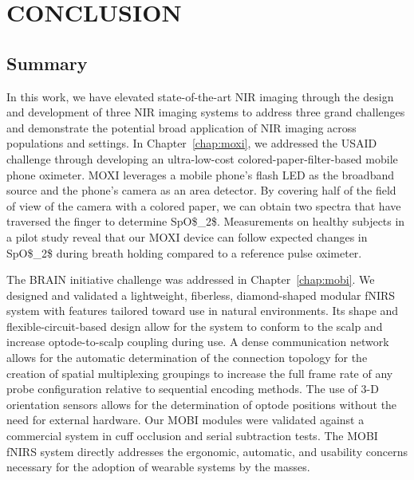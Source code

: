 \chapter{CONCLUSION} %
\label{chap:conclusion}

\section{Summary}
In this work, we have elevated state-of-the-art \ac{NIR} imaging through the design and development of three \ac{NIR} imaging systems to address three grand challenges and demonstrate the potential broad application of \ac{NIR} imaging across populations and settings. In Chapter~\ref{chap:moxi}, we addressed the \ac{USAID} challenge through developing an ultra-low-cost colored-paper-filter-based mobile phone oximeter. \ac{MOXI} leverages a mobile phone's flash \ac{LED} as the broadband source and the phone's camera as an area detector. By covering half of the field of view of the camera with a colored paper, we can obtain two spectra that have traversed the finger to determine \ac{SpO$_2$}. Measurements on healthy subjects in a pilot study reveal that our \ac{MOXI} device can follow expected changes in \ac{SpO$_2$} during breath holding compared to a reference pulse oximeter.

The \ac{BRAIN} initiative challenge was addressed in Chapter~\ref{chap:mobi}. We designed and validated a lightweight, fiberless, diamond-shaped modular \ac{fNIRS} system with features tailored toward use in natural environments. Its shape and flexible-circuit-based design allow for the system to conform to the scalp and increase optode-to-scalp coupling during use. A dense communication network allows for the automatic determination of the connection topology for the creation of spatial multiplexing groupings to increase the full frame rate of any probe configuration relative to sequential encoding methods. The use of 3-D orientation sensors allows for the determination of optode positions without the need for external hardware. Our \ac{MOBI} modules were validated against a commercial system in cuff occlusion and serial subtraction tests. The \ac{MOBI} \ac{fNIRS} system directly addresses the ergonomic, automatic, and usability concerns necessary for the adoption of wearable systems by the masses. 

